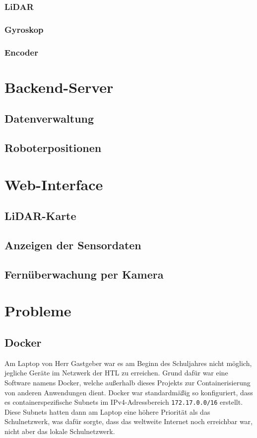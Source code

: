 \documentclass[12pt]{article}
\begin{document}
	\subsubsection{LiDAR}
	\label{lidar}
	\subsubsection{Gyroskop}
	\subsubsection{Encoder}
	\section{Backend-Server}
	\subsection{Datenverwaltung}
	\subsection{Roboterpositionen}
	\section{Web-Interface}
	\subsection{LiDAR-Karte}
	\subsection{Anzeigen der Sensordaten}
	\subsection{Fernüberwachung per Kamera}
	\section{Probleme}
	\subsection{Docker}
	Am Laptop von Herr Gastgeber war es am Beginn des Schuljahres nicht möglich,
	jegliche Geräte im Netzwerk der HTL zu erreichen.
	Grund dafür war eine Software namens Docker,
	welche außerhalb dieses Projekts zur Containerisierung von anderen Anwendungen dient.
	Docker war standardmäßig so konfiguriert,
	dass es containerspezifische Subnets im IPv4-Adressbereich \verb|172.17.0.0/16| erstellt.
	Diese Subnets hatten dann am Laptop eine höhere Priorität als das Schulnetzwerk,
	was dafür sorgte,
	dass das weltweite Internet noch erreichbar war, 
	nicht aber das lokale Schulnetzwerk.

	\newpage
	\begin{appendix}
		\listoffigures
		\listoftables
	\end{appendix}
	\vspace{1cm}
\end{document}
